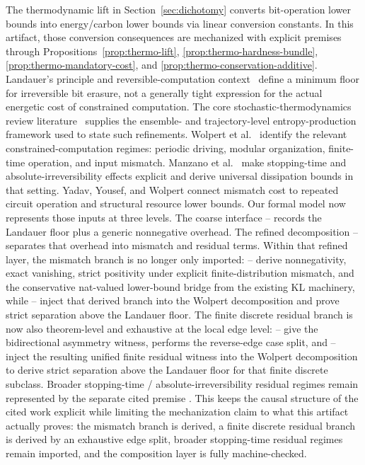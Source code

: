 The thermodynamic lift in Section~\ref{sec:dichotomy} converts bit-operation lower bounds into energy/carbon lower bounds via linear conversion constants. In this artifact, those conversion consequences are mechanized with explicit premises through Propositions~\ref{prop:thermo-lift}, \ref{prop:thermo-hardness-bundle}, \ref{prop:thermo-mandatory-cost}, and \ref{prop:thermo-conservation-additive}. Landauer's principle and reversible-computation context~\cite{landauer1961irreversibility,bennett2003notes} define a minimum floor for irreversible bit erasure, not a generally tight expression for the actual energetic cost of constrained computation. The core stochastic-thermodynamics review literature~\cite{vandenbroeck2015ensemble} supplies the ensemble- and trajectory-level entropy-production framework used to state such refinements. Wolpert et al.\ \cite{wolpert2024stochastic} identify the relevant constrained-computation regimes: periodic driving, modular organization, finite-time operation, and input mismatch. Manzano et al.\ \cite{manzano2024absolute} make stopping-time and absolute-irreversibility effects explicit and derive universal dissipation bounds in that setting. Yadav, Yousef, and Wolpert \cite{yadav2026minimal} connect mismatch cost to repeated circuit operation and structural resource lower bounds. Our formal model now represents those inputs at three levels. The coarse interface -- records the Landauer floor plus a generic nonnegative overhead. The refined decomposition -- separates that overhead into mismatch and residual terms. Within that refined layer, the mismatch branch is no longer only imported: -- derive nonnegativity, exact vanishing, strict positivity under explicit finite-distribution mismatch, and the conservative nat-valued lower-bound bridge from the existing KL machinery, while -- inject that derived branch into the Wolpert decomposition and prove strict separation above the Landauer floor. The finite discrete residual branch is now also theorem-level and exhaustive at the local edge level: -- give the bidirectional asymmetry witness,  performs the reverse-edge case split, and -- inject the resulting unified finite residual witness into the Wolpert decomposition to derive strict separation above the Landauer floor for that finite discrete subclass. Broader stopping-time / absolute-irreversibility residual regimes remain represented by the separate cited premise . This keeps the causal structure of the cited work explicit while limiting the mechanization claim to what this artifact actually proves: the mismatch branch is derived, a finite discrete residual branch is derived by an exhaustive edge split, broader stopping-time residual regimes remain imported, and the composition layer is fully machine-checked.

